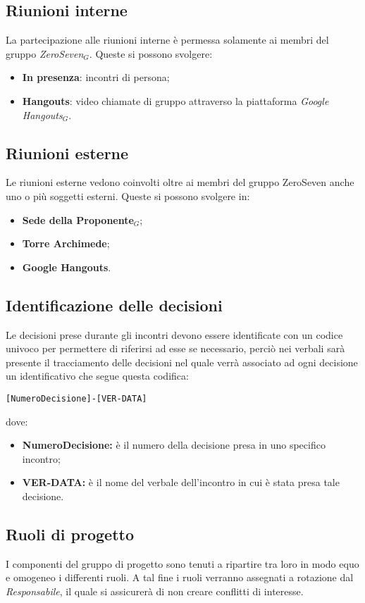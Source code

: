 \subsection{Riunioni interne}
La partecipazione alle riunioni interne è permessa solamente ai membri del gruppo \textit{ZeroSeven$_{G}$}. Queste si possono svolgere:
\begin{itemize}
	\item \textbf{In presenza}: incontri di persona;
	\item \textbf{Hangouts}: video chiamate di gruppo attraverso la piattaforma \textit{Google Hangouts$_{G}$}.
\end{itemize}
\subsection{Riunioni esterne}
Le riunioni esterne vedono coinvolti oltre ai membri del gruppo ZeroSeven anche uno o più soggetti esterni. Queste si possono svolgere  in:
\begin{itemize}
	\item \textbf{Sede della Proponente$_{G}$};
	\item \textbf{Torre Archimede};
	\item \textbf{Google Hangouts}.
\end{itemize}
\subsection{Identificazione delle decisioni}
Le decisioni prese durante gli incontri devono essere identificate con un codice univoco per permettere di riferirsi ad esse se necessario, perciò nei verbali sarà presente il tracciamento delle decisioni nel quale verrà associato ad ogni decisione un identificativo che segue questa codifica:
\begin{center}
	\texttt{[NumeroDecisione]-[VER-DATA]}
\end{center}
dove:
\begin{itemize}
	\item \textbf{NumeroDecisione:} è il numero della decisione presa in uno specifico incontro;
	\item \textbf{VER-DATA:} è il nome del verbale dell'incontro in cui è stata presa tale decisione.
\end{itemize}



\subsection{Ruoli di progetto}
I componenti del gruppo di progetto sono tenuti a ripartire tra loro in modo equo e omogeneo i differenti ruoli. A tal fine i ruoli verranno assegnati a rotazione dal \textit{Responsabile}, il quale si assicurerà di non creare conflitti di interesse.
